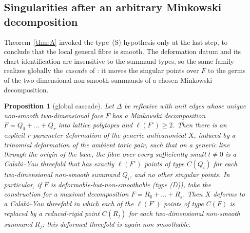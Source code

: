 \documentclass[11pt]{amsart}
\newtheorem{proposition}[theorem]{Proposition}
\theoremstyle{definition}
\theoremstyle{remark}
\begin{document}
\subsection{Singularities after an arbitrary Minkowski decomposition}\label{sec:cascade}

Theorem~\ref{thm:A} invoked the type~(S) hypothesis only at the last step, to
conclude that the local general fibre is smooth.  The deformation datum and its
chart identification are insensitive to the summand types, so the same family
realizes globally the \emph{cascade} of \cite[Lemma~2.4]{paper1}: it moves the
singular points over $F$ to the germs of the two-dimensional non-smooth summands
of a chosen Minkowski decomposition.

\begin{proposition}[global cascade]\label{prop:cascade}
Let $\Delta$ be reflexive with unit edges whose \emph{unique} non-smooth
two-dimensional face $F$ has a
Minkowski decomposition $F = Q_0 + \dots + Q_r$ into lattice polytopes and
$\ell(F^\circ) \ge 2$.  Then there is an explicit $r$-parameter deformation of the
generic anticanonical $X$, induced by a trinomial deformation of the ambient
toric pair,
such that on a generic line through the origin of the base, the fibre over
every sufficiently small $t \neq 0$ is a Calabi--Yau threefold that has exactly
$\ell(F^\circ)$ points of type $C(Q_i)$ for each
two-dimensional non-smooth summand $Q_i$, and no other singular points.
In particular, if $F$ is deformable-but-non-smoothable (type
\textup{(D)}), take the construction for a maximal decomposition
$F=R_0+\dots+R_s$.  Then $X$ deforms to a Calabi--Yau threefold in which
each of the $\ell(F^\circ)$ points of type $C(F)$ is replaced by a reduced-rigid
point $C(R_j)$ for each two-dimensional non-smooth summand $R_j$; this
deformed threefold is again non-smoothable.
\end{proposition}
\end{document}
